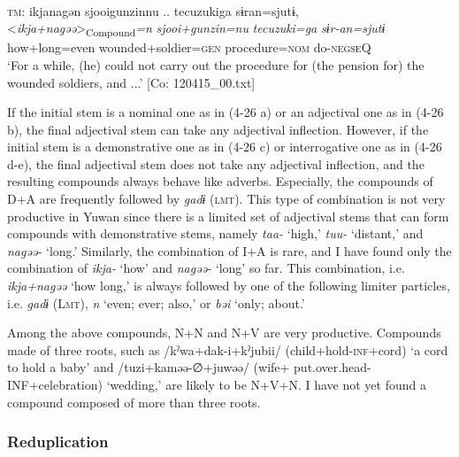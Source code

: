 \ex{}\\\label{ex:4.26e}
\glll    \textsc{tm}:  ikjanagən  {\textbar}sjooigunzin{\textbar}nu ..  {\textbar}tecuzuki{\textbar}ga  sɨran=sjutɨ,    \\
      <\textit{ikja+nagəə}>\textsubscript{Compound}\textit{=n}  \textit{sjooi+gunzin=nu}  \textit{tecuzuki=ga}       \textit{sɨr-an=sjutɨ}    \\
      how+long=even  wounded+soldier=\textsc{gen}  procedure=\textsc{nom}     do-\textsc{negseQ}        \\
    \glt       ‘For a while, (he) could not carry out the procedure for (the pension for) the wounded soldiers, and ...’ [Co: 120415\_00.txt]
    \z
\z

If the initial stem is a nominal one as in (4-26 a) or an adjectival one as in (4-26 b), the final adjectival stem can take any adjectival inflection. However, if the initial stem is a demonstrative one as in (4-26 c) or interrogative one as in (4-26 d-e), the final adjectival stem does not take any adjectival inflection, and the resulting compounds always behave like adverbs. Especially, the compounds of D+A are frequently followed by \textit{gadɨ} (\textsc{lmt}). This type of combination is not very productive in Yuwan since there is a limited set of adjectival stems that can form compounds with demonstrative stems, namely \textit{taa-} ‘high,’ \textit{tuu-} ‘distant,’ and \textit{nagəə-} ‘long.’ Similarly, the combination of I+A is rare, and I have found only the combination of \textit{ikja-} ‘how’ and \textit{nagəə-} ‘long’ so far. This combination, i.e. \textit{ikja+nagəə} ‘how long,’ is always followed by one of the following limiter particles, i.e. \textit{gadɨ} (L\textsc{mt}), \textit{n} ‘even; ever; also,’ or \textit{bəi} ‘only; about.’

Among the above compounds, N+N and N+V are very productive. Compounds made of three roots, such as /kˀwa+dak-i+kˀjubii/ (child+hold-\textsc{inf}+cord) ‘a cord to hold a baby’ and /tuzi+kaməə-∅+juwəə/ (wife+ put.over.head-INF+celebration) ‘wedding,’ are likely to be N+V+N. I have not yet found a compound composed of more than three roots.

\subsubsection{Reduplication}\label{sec:4.2.3.3}

